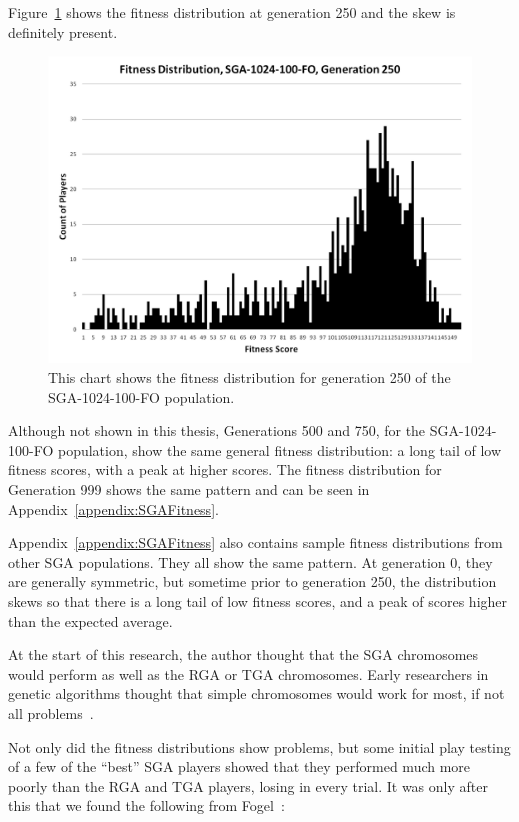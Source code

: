 Figure~\ref{figure-sga_gen250} shows the fitness distribution at generation 250
and the skew is definitely present.

\begin{figure}[htp]
\centerline{\includegraphics[width=0.75\columnwidth]{Figures/SGA_1024_100_FO_gen250.png}}
\caption[SGA Fitness Generation 289]{This chart shows the fitness
distribution for generation 250 of the SGA-1024-100-FO population.}
\label{figure-sga_gen250}
\end{figure}

Although not shown in this thesis, Generations 500 and 750, for the
SGA-1024-100-FO population, show the same general fitness distribution: a long
tail of low fitness scores, with a peak at higher scores. The fitness
distribution for Generation 999 shows the same pattern and can be seen in
Appendix~\ref{appendix:SGAFitness}. 

Appendix~\ref{appendix:SGAFitness} also contains sample fitness distributions
from other SGA populations. They all show the same pattern. At generation 0,
they are generally symmetric, but sometime prior to generation 250, the
distribution skews so that there is a long tail of low fitness scores, and a
peak of scores higher than the expected average.

At the start of this research, the author thought that the SGA chromosomes would
perform as well as the RGA or TGA chromosomes. Early researchers in genetic
algorithms thought that simple chromosomes would work for most, if not all
problems~\cite{goldberg1989genetic}.

Not only did the fitness distributions show problems, but some initial play
testing of a few of the ``best'' SGA players showed that they performed much
more poorly than the RGA and TGA players, losing in every trial. It was only 
after this that we found the following from Fogel~\cite{fogel1999intelligence}:

